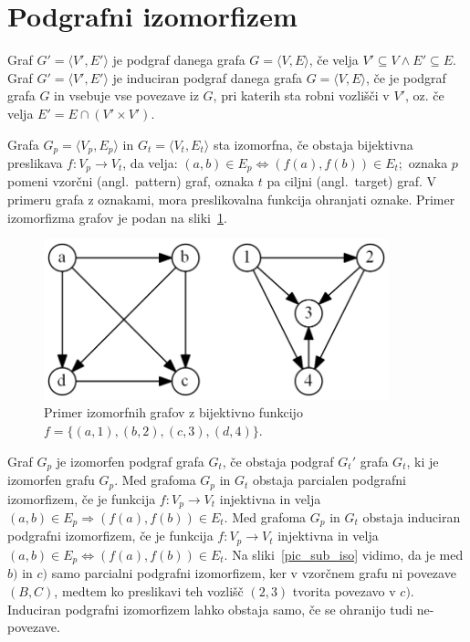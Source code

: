 \documentclass[a4paper, 12pt, ]{book}
\begin{document}
	\section{Podgrafni izomorfizem}
	Graf $G' = \langle V', E' \rangle$ je podgraf danega grafa $G = \langle V, E \rangle$, če velja $V' \subseteq V \wedge E' \subseteq E$. 
	Graf $G' = \langle V', E' \rangle$ je induciran podgraf danega grafa $G = \langle V, E \rangle$, če je podgraf grafa $G$ in vsebuje vse povezave iz $G$, 
	pri katerih sta robni vozlišči v $V'$, oz. če velja $E' = E \cap (V' \times V')$.

	Grafa $G_p = \langle V_p, E_p \rangle $ in $G_t = \langle V_t, E_t \rangle$ sta izomorfna, če obstaja bijektivna preslikava $f: V_p \to V_t$, da velja: 
	$(a,b) \in E_p \Leftrightarrow (f(a), f(b)) \in E_t;$
	oznaka $p$ pomeni vzorčni (angl.~pattern) graf, oznaka $t$ pa ciljni (angl.~target) graf. V primeru grafa z oznakami, mora preslikovalna funkcija
	ohranjati oznake. Primer izomorfizma grafov je podan na sliki~\ref{pic_iso}.

	\begin{figure}
	\begin{center}
	\includegraphics[width=10cm]{img/graph_izomorph.png}
	\end{center}
	\caption{Primer izomorfnih grafov z bijektivno funkcijo $f = \{(a, 1), (b, 2), (c, 3), (d, 4)\}$.}
	\label{pic_iso}
	\end{figure}


	Graf $G_p$ je izomorfen podgraf grafa $G_t$, če obstaja podgraf $G_t'$ grafa $G_t$, ki je izomorfen grafu $G_p$.
	Med grafoma $G_p$ in $G_t$ obstaja parcialen podgrafni izomorfizem, če je funkcija $f: V_p \to V_t$ injektivna in velja
	$(a,b) \in E_p \Rightarrow (f(a), f(b)) \in E_t$.
	Med grafoma $G_p$ in $G_t$ obstaja induciran podgrafni izomorfizem, če je funkcija $f: V_p \to V_t$ injektivna in velja
	$(a,b) \in E_p \Leftrightarrow (f(a), f(b)) \in E_t$. Na sliki~\ref{pic_sub_iso} vidimo, da je med $b)$ in $c)$ samo parcialni podgrafni
	izomorfizem, ker v vzorčnem grafu ni povezave $(B, C)$, medtem ko preslikavi teh vozlišč $(2, 3)$ tvorita povezavo v $c)$. Induciran 
	podgrafni izomorfizem lahko obstaja samo, če se ohranijo tudi ne-povezave.
	
\end{document}
